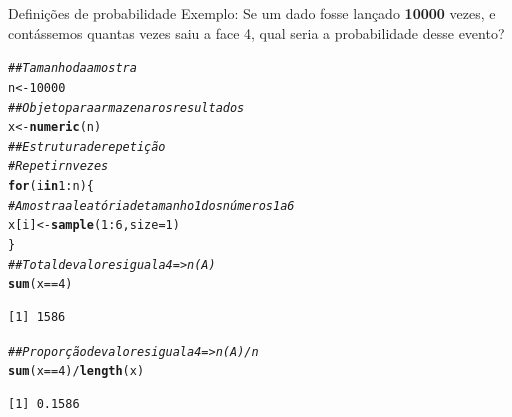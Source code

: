 \documentclass[10pt]{beamer}\usepackage[]{graphicx}\usepackage[]{color}
\makeatletter
\newcommand{\hlnum}[1]{\textcolor[rgb]{0.686,0.059,0.569}{#1}}%
\newcommand{\hlcom}[1]{\textcolor[rgb]{0.678,0.584,0.686}{\textit{#1}}}%
\newcommand{\hlopt}[1]{\textcolor[rgb]{0,0,0}{#1}}%
\newcommand{\hlstd}[1]{\textcolor[rgb]{0.345,0.345,0.345}{#1}}%
\newcommand{\hlkwa}[1]{\textcolor[rgb]{0.161,0.373,0.58}{\textbf{#1}}}%
\newcommand{\hlkwb}[1]{\textcolor[rgb]{0.69,0.353,0.396}{#1}}%
\newcommand{\hlkwc}[1]{\textcolor[rgb]{0.333,0.667,0.333}{#1}}%
\newcommand{\hlkwd}[1]{\textcolor[rgb]{0.737,0.353,0.396}{\textbf{#1}}}%
\newenvironment{kframe}{%
 \def\at@end@of@kframe{}%
 \ifinner\ifhmode%
  \def\at@end@of@kframe{\end{minipage}}%
  \begin{minipage}{\columnwidth}%
 \fi\fi%
 \def\FrameCommand##1{\hskip\@totalleftmargin \hskip-\fboxsep
 \colorbox{shadecolor}{##1}\hskip-\fboxsep
     \hskip-\linewidth \hskip-\@totalleftmargin \hskip\columnwidth}%
 \MakeFramed {\advance\hsize-\width
   \@totalleftmargin\z@ \linewidth\hsize
   \@setminipage}}%
 {\par\unskip\endMakeFramed%
 \at@end@of@kframe}
\newenvironment{knitrout}{}{} %
\theoremstyle{definition}
\makeatother
\begin{document}
\begin{frame}[fragile]{Definições de probabilidade}
  Exemplo: Se um dado fosse lançado \textbf{10000} vezes, e contássemos
  quantas vezes saiu a face 4, qual seria a probabilidade desse evento?
\begin{knitrout}\footnotesize
{}\color{fgcolor}\begin{kframe}
\begin{alltt}
\hlcom{## Tamanho da amostra}
\hlstd{n} \hlkwb{<-} \hlnum{10000}
\hlcom{## Objeto para armazenar os resultados}
\hlstd{x} \hlkwb{<-} \hlkwd{numeric}\hlstd{(n)}
\hlcom{## Estrutura de repetição}
\hlcom{# Repetir n vezes}
\hlkwa{for}\hlstd{(i} \hlkwa{in} \hlnum{1}\hlopt{:}\hlstd{n)\{}
    \hlcom{# Amostra aleatória de tamanho 1 dos números 1 a 6}
    \hlstd{x[i]} \hlkwb{<-} \hlkwd{sample}\hlstd{(}\hlnum{1}\hlopt{:}\hlnum{6}\hlstd{,} \hlkwc{size} \hlstd{=} \hlnum{1}\hlstd{)}
\hlstd{\}}
\hlcom{## Total de valores igual a 4 => n(A)}
\hlkwd{sum}\hlstd{(x} \hlopt{==} \hlnum{4}\hlstd{)}
\end{alltt}
\begin{verbatim}
[1] 1586
\end{verbatim}
\begin{alltt}
\hlcom{## Proporção de valores igual a 4 => n(A)/n}
\hlkwd{sum}\hlstd{(x} \hlopt{==} \hlnum{4}\hlstd{)}\hlopt{/}\hlkwd{length}\hlstd{(x)}
\end{alltt}
\begin{verbatim}
[1] 0.1586
\end{verbatim}
\end{kframe}
\end{knitrout}
\end{frame}
\end{document}
